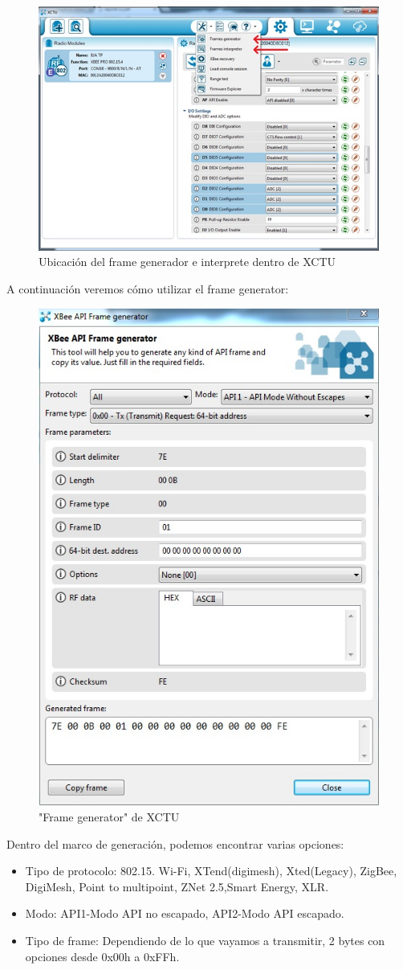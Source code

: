 \documentclass[11pt,oneside,spanish,a4paper]{article}
\begin{document}
\begin{figure}[ht]
	\centering
	\includegraphics[width=.6\textwidth]{img/IMAGEN08.jpg}
	\caption{Ubicaci\'on del frame generador e interprete dentro de XCTU}
\end{figure}
A continuación veremos cómo utilizar el frame generator:
\begin{figure}[ht]
	\centering
	\includegraphics[width=.6\textwidth]{img/IMAGEN09.jpg}
	\caption{"Frame generator" de XCTU}
\end{figure}
Dentro del marco de generaci\'on, podemos encontrar varias opciones:
\begin{itemize}
	\item Tipo de protocolo: 802.15. Wi-Fi, XTend(digimesh), Xted(Legacy), ZigBee, DigiMesh, Point to multipoint, ZNet 2.5,Smart Energy, XLR.
	\item Modo: API1-Modo API no escapado, API2-Modo API escapado.
	\item Tipo de frame: Dependiendo de lo que vayamos a transmitir, 2 bytes con opciones desde 0x00h a 0xFFh.
	\end{itemize}
\end{document}
